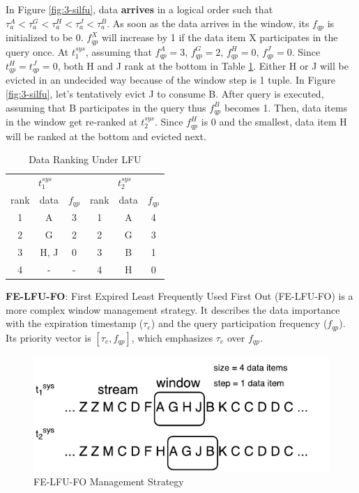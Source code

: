 In Figure \ref{fig:3-silfu}, data \textbf{arrives} in a logical order such that $\tau^{A}_{a} < \tau^{G}_{a} < \tau^{H}_{a} < \tau^{J}_{a} < \tau^{B}_{a}$. 
As soon as the data arrives in the window, its $f_{qp}$ is initialized to be 0.
$f^{X}_{qp}$ will increase by 1 if the data item X participates in the query once.
At $t^{sys}_{1}$, assuming that $f^{A}_{qp} = 3$, $f^{G}_{qp} = 2$, $f^{H}_{qp} = 0$, $f^{J}_{qp} = 0$. 
Since $t^{H}_{qp} = t^{J}_{qp} = 0$, both H and J rank at the bottom in Table \ref{tab:lfu}. 
Either H or J will be evicted in an undecided way because of the window step is 1 tuple. 
In Figure \ref{fig:3-silfu}, let's tentatively evict J to consume B. 
After query is executed, assuming that B participates in the query thus $f^{B}_{qp}$ becomes 1.
Then, data items in the window get re-ranked at $t^{sys}_{2}$.
Since $f^{H}_{qp}$ is 0 and the smallest, data item H will be ranked at the bottom and evicted next. 

\begin{table}[!htbp]
\centering
\caption{Data Ranking Under LFU}
\label{tab:lfu}
\begin{tabular}{|c|c|c||c|c|c|}
\hline
\multicolumn{3}{|c||}{$t^{sys}_{1}$} & \multicolumn{3}{c|}{$t^{sys}_{2}$} \\ \hhline{|===#===|}
rank & data & $f_{qp}$ & rank & data & $f_{qp}$ \\ \hhline{|=|=|=#=|=|=|}
1 & A & 3 & 1 & A & 4 \\ \hline
2 & G & 2 & 2 & G & 3 \\ \hline
3 & H, J & 0 & 3 & B & 1 \\ \hline
4 & - & - & 4 & H & 0 \\ \hline
\end{tabular}
\end{table}

\textbf{FE-LFU-FO}:
First Expired Least Frequently Used First Out (FE-LFU-FO) is a more complex window management strategy. 
It describes the data importance with the expiration timestamp ($\tau_{e}$) and the query participation frequency ($f_{qp}$).
Its priority vector is $[\tau_{e}, f_{qp}]$, which emphasizes $\tau_{e}$ over $f_{qp}$. 

\begin{figure}[!htbp]
	\centering
    \includegraphics[width=5in]{img/3-sifelfufo.pdf}
    \caption{FE-LFU-FO Management Strategy}
    \label{fig:3-sifelfufo}
\end{figure}

